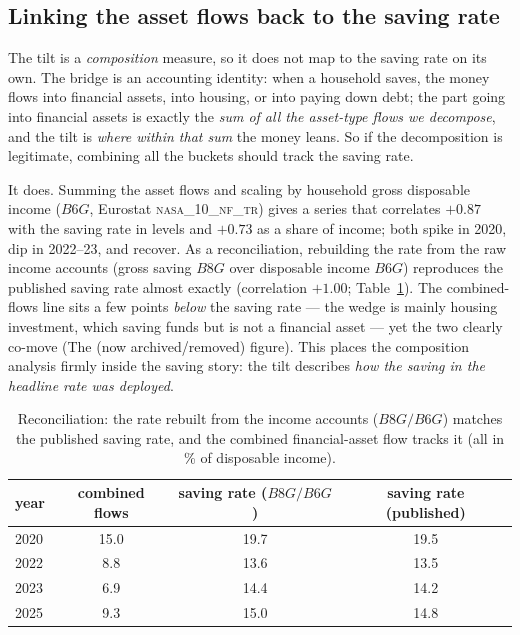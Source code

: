 \documentclass[11pt,a4paper]{article}
\newcommand{\dataset}[1]{\textsc{#1}}
\begin{document}
\subsection{Linking the asset flows back to the saving rate}
The tilt is a \emph{composition} measure, so it does not map to the saving rate on
its own. The bridge is an accounting identity: when a household saves, the money
flows into financial assets, into housing, or into paying down debt; the part going
into financial assets is exactly the \emph{sum of all the asset-type flows we
decompose}, and the tilt is \emph{where within that sum} the money leans. So if the
decomposition is legitimate, combining all the buckets should track the saving
rate.

It does. Summing the asset flows and scaling by household gross disposable income
($B6G$, Eurostat \dataset{nasa\_10\_nf\_tr}) gives a series that correlates
$+0.87$ with the saving rate in levels and $+0.73$ as a share of income; both
spike in 2020, dip in 2022--23, and recover. As a reconciliation, rebuilding the
rate from the raw income accounts (gross saving $B8G$ over disposable income
$B6G$) reproduces the published saving rate almost exactly (correlation $+1.00$;
Table~\ref{tab:reconcile}). The combined-flows line sits a few points \emph{below}
the saving rate --- the wedge is mainly housing investment, which saving funds but
is not a financial asset --- yet the two clearly co-move
(The (now archived/removed) figure). This places the composition analysis firmly
inside the saving story: the tilt describes \emph{how the saving in the headline
rate was deployed}.

\begin{table}[htbp]\centering
\caption{Reconciliation: the rate rebuilt from the income accounts ($B8G/B6G$)
matches the published saving rate, and the combined financial-asset flow tracks it
(all in \% of disposable income).}
\label{tab:reconcile}
\renewcommand{\arraystretch}{1.15}
\begin{tabular}{@{}lccc@{}}
\toprule
year & combined flows & saving rate ($B8G/B6G$) & saving rate (published) \\
\midrule
2020 & 15.0 & 19.7 & 19.5 \\
2022 &  8.8 & 13.6 & 13.5 \\
2023 &  6.9 & 14.4 & 14.2 \\
2025 &  9.3 & 15.0 & 14.8 \\
\bottomrule
\end{tabular}
\end{table}
\end{document}
